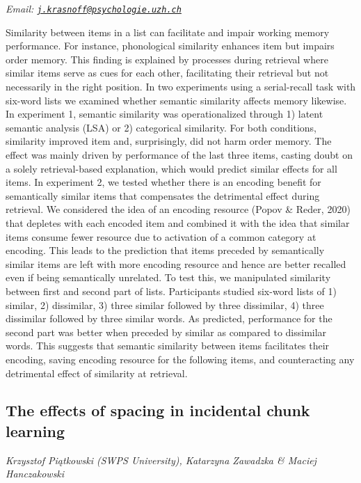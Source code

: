 \documentclass[
  12pt,
]{book}
\begin{document}
\emph{Email: \href{mailto:j.krasnoff@psychologie.uzh.ch}{\nolinkurl{j.krasnoff@psychologie.uzh.ch}}}

Similarity between items in a list can facilitate and impair working memory performance. For instance, phonological similarity enhances item but impairs order memory. This finding is explained by processes during retrieval where similar items serve as cues for each other, facilitating their retrieval but not necessarily in the right position. In two experiments using a serial-recall task with six-word lists we examined whether semantic similarity affects memory likewise. In experiment 1, semantic similarity was operationalized through 1) latent semantic analysis (LSA) or 2) categorical similarity. For both conditions, similarity improved item and, surprisingly, did not harm order memory. The effect was mainly driven by performance of the last three items, casting doubt on a solely retrieval-based explanation, which would predict similar effects for all items. In experiment 2, we tested whether there is an encoding benefit for semantically similar items that compensates the detrimental effect during retrieval. We considered the idea of an encoding resource (Popov \& Reder, 2020) that depletes with each encoded item and combined it with the idea that similar items consume fewer resource due to activation of a common category at encoding. This leads to the prediction that items preceded by semantically similar items are left with more encoding resource and hence are better recalled even if being semantically unrelated. To test this, we manipulated similarity between first and second part of lists. Participants studied six-word lists of 1) similar, 2) dissimilar, 3) three similar followed by three dissimilar, 4) three dissimilar followed by three similar words. As predicted, performance for the second part was better when preceded by similar as compared to dissimilar words. This suggests that semantic similarity between items facilitates their encoding, saving encoding resource for the following items, and counteracting any detrimental effect of similarity at retrieval.

\hypertarget{the-effects-of-spacing-in-incidental-chunk-learning}{%
\subsection{The effects of spacing in incidental chunk learning}\label{the-effects-of-spacing-in-incidental-chunk-learning}}

\emph{Krzysztof Piątkowski (SWPS University), Katarzyna Zawadzka \& Maciej Hanczakowski}
\end{document}
